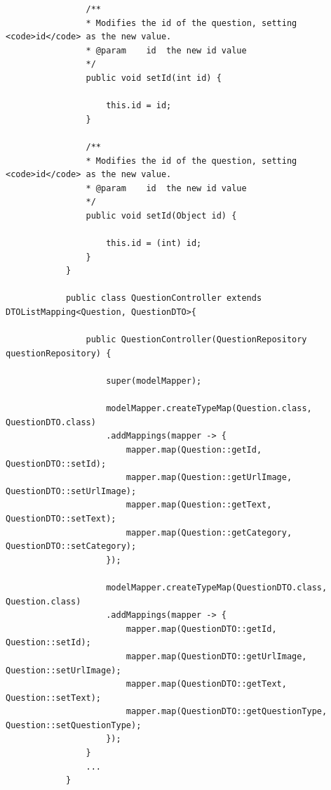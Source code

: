 \documentclass[12pt]{article}
\begin{document}
\begin{itemize}
\begin{lstlisting}
				/**
				* Modifies the id of the question, setting <code>id</code> as the new value.
				* @param	id	the new id value
				*/
				public void setId(int id) {
					
					this.id = id;
				}
				
				/**
				* Modifies the id of the question, setting <code>id</code> as the new value.
				* @param	id	the new id value
				*/
				public void setId(Object id) {
					
					this.id = (int) id;
				}
			}
			
			public class QuestionController extends DTOListMapping<Question, QuestionDTO>{
				
				public QuestionController(QuestionRepository questionRepository) {
					
					super(modelMapper);
					
					modelMapper.createTypeMap(Question.class, QuestionDTO.class)
					.addMappings(mapper -> {
						mapper.map(Question::getId, QuestionDTO::setId);
						mapper.map(Question::getUrlImage, QuestionDTO::setUrlImage);
						mapper.map(Question::getText, QuestionDTO::setText);
						mapper.map(Question::getCategory, QuestionDTO::setCategory);
					});
					
					modelMapper.createTypeMap(QuestionDTO.class, Question.class)
					.addMappings(mapper -> {
						mapper.map(QuestionDTO::getId, Question::setId);
						mapper.map(QuestionDTO::getUrlImage, Question::setUrlImage);
						mapper.map(QuestionDTO::getText, Question::setText);
						mapper.map(QuestionDTO::getQuestionType, Question::setQuestionType);
					});
				}
				...
			}
		\end{lstlisting}
	\end{itemize}
	
\end{document}
